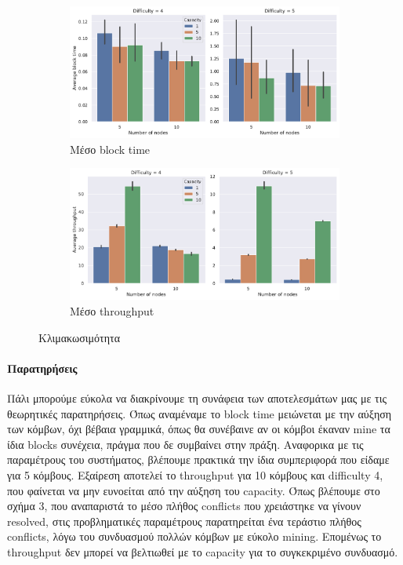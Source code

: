 \documentclass[titlepage]{article}
\begin{document}
\begin{figure}[!ht]
    \begin{subfigure}{\textwidth}
        \includegraphics[width=\textwidth]{scalability_average_block_time.pdf}
        \caption{Μέσο block time}
    \end{subfigure}
    \begin{subfigure}{\textwidth}
        \includegraphics[width=\textwidth]{scalability_average_throughput.pdf}
        \caption{Μέσο throughput}
    \end{subfigure}
    \caption{Κλιμακωσιμότητα}
\end{figure}

\paragraph{Παρατηρήσεις}

Πάλι μπορούμε εύκολα να διακρίνουμε τη συνάφεια των αποτελεσμάτων μας με τις θεωρητικές παρατηρήσεις. Όπως αναμέναμε το block time μειώνεται με την αύξηση των κόμβων, όχι βέβαια γραμμικά, όπως θα συνέβαινε αν οι κόμβοι έκαναν mine τα ίδια blocks συνέχεια, πράγμα που δε συμβαίνει στην πράξη. Αναφορικα με τις παραμέτρους του συστήματος, βλέπουμε πρακτικά την ίδια συμπεριφορά που είδαμε για 5 κόμβους. Εξαίρεση αποτελεί το throughput για 10 κόμβους και difficulty 4, που φαίνεται να μην ευνοείται από την αύξηση του capacity. Όπως βλέπουμε στο σχήμα 3, που αναπαριστά το μέσο πλήθος conflicts που χρειάστηκε να γίνουν resolved, στις προβληματικές παραμέτρους παρατηρείται ένα τεράστιο πλήθος conflicts, λόγω του συνδυασμού πολλών κόμβων με εύκολο mining. Επομένως το throughput δεν μπορεί να βελτιωθεί με το capacity για το συγκεκριμένο συνδυασμό.
\end{document}
